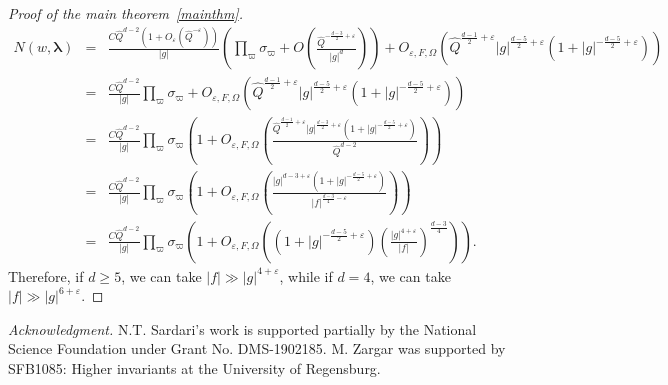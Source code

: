 \documentclass[11pt]{amsart}
\theoremstyle{plain}
\theoremstyle{plain}
\theoremstyle{remark}
\theoremstyle{definition}
\newcommand{\hQ}{\widehat{Q}}
\begin{document}
\begin{proof}[Proof of the main theorem~\ref{mainthm}]
\begin{eqnarray*}N(w,\boldsymbol{\lambda})&=&\frac{C\hQ^{d-2}(1+O_{\varepsilon}(\hQ^{-\varepsilon}))}{|g|}\left(\prod_{\varpi}\sigma_{\varpi}+O\left(\frac{\hQ^{-\frac{d-3}{2}+\varepsilon}}{|g|^d}\right)\right)+O_{\varepsilon,F,\Omega}\left(\hQ^{\frac{d-1}{2}+\varepsilon}|g|^{\frac{d-5}{2}+\varepsilon}(1+|g|^{-\frac{d-5}{2}+\varepsilon})\right)\\&=&\frac{C\hQ^{d-2}}{|g|}\prod_{\varpi}\sigma_{\varpi}+O_{\varepsilon,F,\Omega}\left(\hQ^{\frac{d-1}{2}+\varepsilon}|g|^{\frac{d-5}{2}+\varepsilon}(1+|g|^{-\frac{d-5}{2}+\varepsilon})\right)\\&=& \frac{C\hQ^{d-2}}{|g|}\prod_{\varpi}\sigma_{\varpi}\left(1+O_{\varepsilon,F,\Omega}\left(\frac{\hQ^{\frac{d-1}{2}+\varepsilon}|g|^{\frac{d-3}{2}+\varepsilon}(1+|g|^{-\frac{d-5}{2}+\varepsilon})}{\hQ^{d-2}}\right)\right)\\&=&\frac{C\hQ^{d-2}}{|g|}\prod_{\varpi}\sigma_{\varpi}\left(1+O_{\varepsilon,F,\Omega}\left(\frac{|g|^{d-3+\varepsilon}(1+|g|^{-\frac{d-5}{2}+\varepsilon})}{|f|^{\frac{d-3}{4}-\varepsilon}}\right)\right)\\&=& \frac{C\hQ^{d-2}}{|g|}\prod_{\varpi}\sigma_{\varpi}\left(1+O_{\varepsilon,F,\Omega}\left((1+|g|^{-\frac{d-5}{2}+\varepsilon})\left(\frac{|g|^{4+\varepsilon}}{|f|}\right)^{\frac{d-3}{4}}\right)\right).\end{eqnarray*}
Therefore, if $d\geq 5$, we can take $|f|\gg |g|^{4+\varepsilon}$, while if $d=4$, we can take $|f|\gg |g|^{6+\varepsilon}$.
\end{proof}
\textit{Acknowledgment.} N.T. Sardari's work is supported partially by the National Science Foundation under Grant No. DMS-1902185.
M. Zargar was supported by SFB1085: Higher invariants at the University of Regensburg. 


\end{document}
